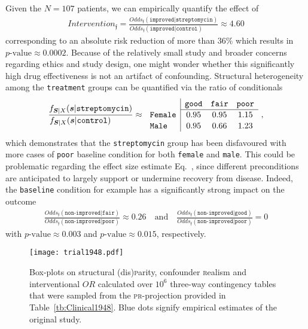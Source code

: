 \documentclass[10pt]{article}
\renewcommand{\eqref}{Eq.~\originaleqref}
\newcommand{\equ}[1]{\begin{gather} #1 \end{gather}}
\newcommand{\qand}{\quad \text{and} \quad}
\newcommand{\prob}[1]{\mathfrak{#1}}
\begin{document}
Given the $N=107$ patients, we can empirically quantify the  effect of 
\equ{
\label{eq:1948:Intervention}
Intervention_{\prob f} = \frac{Odds_{\prob f}(\texttt{improved} \vert \texttt{streptomycin})}{Odds_{\prob f}(\texttt{improved} \vert \texttt{control})\phantom{.........}} \approx 4.60
}
corresponding to an absolute risk reduction
of more than $36\%$ 
which results in $p\text{-value}\approx 0.0002$. Because of the relatively small study and broader concerns~\cite{rosenberger2015randomization,https://doi.org/10.1002/sim.4780060325} regarding ethics and study design, one might wonder whether this significantly high drug effectiveness  is not an artifact of confounding. 
%
Structural heterogeneity among the \texttt{treatment} groups can be quantified  via the ratio of conditionals
\equ{
\label{eq:1948:StructuralHeterogeneity}
\frac{ f_{\boldsymbol S\vert X}(\boldsymbol s\vert\texttt{streptomycin})}{ f_{\boldsymbol S\vert X}(\boldsymbol s\vert\texttt{control})\phantom{.........}} \approx\,
\begin{array}{l|ccc}
    \renewcommand{\arraystretch}{1.1}
        & \texttt{good} & \texttt{fair} & \texttt{poor} \\\cline{2-4}
        \texttt{Female} & 0.95 & 0.95 & 1.15 \\
        \texttt{Male}   &  0.95 & 0.66 &  1.23
    \end{array}
    ~,
}
which demonstrates that  the \texttt{streptomycin} group has been disfavoured with more cases of \texttt{poor} baseline condition  for both \texttt{female} and \texttt{male}.
%
This could be problematic regarding the effect size estimate \eqref{eq:1948:Intervention}, since different preconditions %
are anticipated to largely support or undermine recovery from disease. 
Indeed, the \texttt{baseline} condition for example has a significantly strong impact on the outcome
\equ{
\frac{Odds_{\prob f}(\texttt{non-improved}\vert \texttt{fair})}{Odds_{\prob f}(\texttt{non-improved}\vert \texttt{poor})}\approx 0.26
\qand
\frac{Odds_{\prob f}(\texttt{non-improved}\vert \texttt{good})}{Odds_{\prob f}(\texttt{non-improved}\vert \texttt{poor})}=0
}
with $p\text{-value}\approx0.003$ and $p\text{-value}\approx0.015$, respectively.


%
\begin{figure}[!t]
    \centering
    \texttt{[image: trial1948.pdf]}
    \caption{Box-plots on structural (dis)\textsc{p}arity, confounder \textsc{r}ealism and interventional $OR$ calculated over $10^6$ three-way contingency tables that were sampled from the \textsc{pr}-projection provided in Table~\ref{tb:Clinical1948}. Blue dots signify empirical estimates of the original study.}
    \label{fig:1948}
\end{figure}
\end{document}
